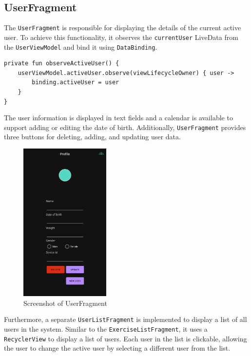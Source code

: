\subsection{UserFragment}
The \texttt{UserFragment} is responsible for displaying the details of the current active user. 
To achieve this functionality, it observes the \texttt{currentUser} LiveData from the \texttt{UserViewModel} and bind it using \texttt{DataBinding}. 
\begin{lstlisting}[caption={Observer for currentUser (Kotlin - UserFragment)}]
private fun observeActiveUser() {
    userViewModel.activeUser.observe(viewLifecycleOwner) { user ->
        binding.activeUser = user
    }
}
\end{lstlisting}
The user information is displayed in text fields and a calendar is available to support adding or editing the date of birth. 
Additionally, \texttt{UserFragment} provides three buttons for deleting, adding, and updating user data.
\begin{figure}[H]
    \centering
    \includegraphics[width=0.4\textwidth]{images/userfragment-screenshot.png}
    \caption{Screenshot of UserFragment}
    \label{fig:userfragment_screenshot}
\end{figure}

Furthermore, a separate \texttt{UserListFragment} is implemented to display a list of all users in the system. 
Similar to the \texttt{ExerciseListFragment}, it uses a \texttt{RecyclerView} to display a list of users. 
Each user in the list is clickable, allowing the user to change the active user by selecting a different user from the list.


